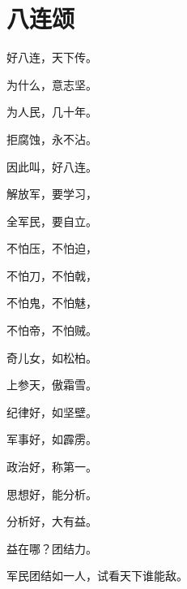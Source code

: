 \section[八连颂（一九六三年八月一日）]{八连颂}


好八连，天下传。

为什么，意志坚。

为人民，几十年。

拒腐蚀，永不沾。

因此叫，好八连。

解放军，要学习，

全军民，要自立。

不怕压，不怕迫，

不怕刀，不怕戟，

不怕鬼，不怕魅，

不怕帝，不怕贼。

奇儿女，如松柏。

上参天，傲霜雪。

纪律好，如坚壁。

军事好，如霹雳。

政治好，称第一。

思想好，能分析。

分析好，大有益。

益在哪？团结力。

军民团结如一人，试看天下谁能敌。

